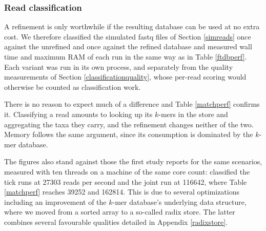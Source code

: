 \documentclass[pdflatex,sn-vancouver-num]{sn-jnl}
\begin{document}
    \subsubsection{Read classification}\label{classificationperformance}

A refinement is only worthwhile if the resulting database can be used at no extra cost. We therefore classified the simulated fastq files of Section \ref{simreads} once against the unrefined and once against the refined database and measured wall time and maximum RAM of each run in the same way as in Table \ref{ftdbperf}. Each variant was run in its own process, and separately from the quality measurements of Section \ref{classificationquality}, whose per-read scoring would otherwise be counted as classification work.

There is no reason to expect much of a difference and Table \ref{matchperf} confirms it. Classifying a read amounts to looking up its $k$-mers in the store and aggregating the taxa they carry, and the refinement changes neither of the two. Memory follows the same argument, since its consumption is dominated by the $k$-mer database.



The figures also stand against those the first study reports for the same scenarios, measured with ten threads on a machine of the same core count: \citet{genestrip-pub} classified the tick runs at \num{27303} reads per second and the joint run at \num{116642}, where Table \ref{matchperf} reaches \num{39252} and \num{162814}. This is due to several optimizations including an improvement of the $k$-mer database's underlying data structure, where we moved from a sorted array to a so-called radix store. The latter combines several favourable qualities detailed in Appendix \ref{radixstore}.
\end{document}
